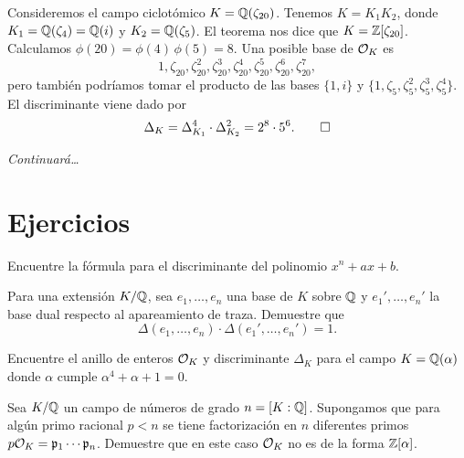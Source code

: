 \begin{ejemplo}
  Consideremos el campo ciclotómico $K = \mathbb{Q} (\zeta_{20})$. Tenemos
  $K = K_1 K_2$, donde $K_1 = \mathbb{Q} (\zeta_4) = \mathbb{Q} (i)$ y $K_2 = \mathbb{Q} (\zeta_5)$.
  El teorema nos dice que $K = \mathbb{Z} [\zeta_{20}]$. Calculamos
  $\phi (20) = \phi (4) \, \phi (5) = 8$. Una posible base de $\mathcal{O}_K$ es
  \[ 1, \zeta_{20}, \zeta_{20}^2, \zeta_{20}^3,
     \zeta_{20}^4, \zeta_{20}^5, \zeta_{20}^6, \zeta_{20}^7, \]
  pero también podríamos tomar el producto de las bases $\{ 1, i \}$ y
  $\{ 1, \zeta_5, \zeta_5^2, \zeta_5^3, \zeta_5^4 \}$.
  El discriminante viene dado por
  \[ \Delta_K = \Delta_{K_1}^4 \cdot \Delta_{K_2}^2 = 2^8\cdot 5^6. \qedhere \]
\end{ejemplo}

\noindent\emph{Continuará\dots}


\pagebreak


\section*{Ejercicios}

\begin{ejercicio}
  Encuentre la fórmula para el discriminante del polinomio $x^n + ax + b$.
\end{ejercicio}

\begin{ejercicio}
  Para una extensión $K/\mathbb{Q}$, sea $e_1,\ldots,e_n$ una base de $K$ sobre $\mathbb{Q}$
  y $e_1', \ldots, e_n'$ la base dual respecto al apareamiento de traza.
  Demuestre que
  $$\Delta (e_1,\ldots,e_n) \cdot \Delta (e_1', \ldots, e_n') = 1.$$
\end{ejercicio}

\begin{ejercicio}
  Encuentre el anillo de enteros $\mathcal{O}_K$ y discriminante $\Delta_K$ para el campo
  $K = \mathbb{Q} (\alpha)$ donde $\alpha$ cumple $\alpha^4 + \alpha + 1 = 0$.
\end{ejercicio}

\begin{ejercicio}
  Sea $K/\mathbb{Q}$ un campo de números de grado $n = [K : \mathbb{Q}]$. Supongamos que para
  algún primo racional $p < n$ se tiene factorización en $n$ diferentes primos
  $p\mathcal{O}_K = \mathfrak{p}_1 \cdots \mathfrak{p}_n$. Demuestre que en este caso
  $\mathcal{O}_K$ no es de la forma $\mathbb{Z} [\alpha]$.
\end{ejercicio}

